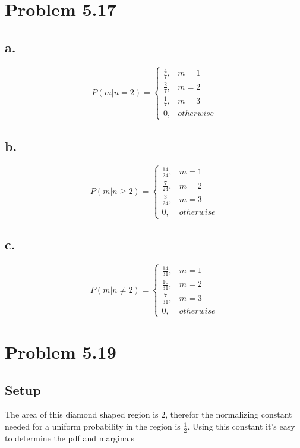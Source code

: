 \documentclass[12pt]{article}
\begin{document}
\section*{Problem 5.17}
\subsection*{a.}
\[P(m|n=2) = \begin{cases}
    \frac{4}{7}, & m = 1 \\
    \frac{2}{7}, & m = 2 \\
    \frac{1}{7}, & m = 3 \\
     0, & otherwise
   \end{cases}
\]

\subsection*{b.}
\[P(m|n\geq2) = \begin{cases}
    \frac{14}{24}, & m = 1 \\
    \frac{7}{24}, & m = 2 \\
    \frac{3}{24}, & m = 3 \\
     0, & otherwise
   \end{cases}
\]

\subsection*{c.}
\[P(m|n\neq2) = \begin{cases}
    \frac{14}{31}, & m = 1 \\
    \frac{10}{31}, & m = 2 \\
    \frac{7}{31}, & m = 3 \\
     0, & otherwise
   \end{cases}
\]

\section*{Problem 5.19}
\subsection*{Setup}
The area of this diamond shaped region is 2, therefor the normalizing constant needed for a uniform probability in the region is $\frac{1}{2}$.
Using this constant it's easy to determine the pdf and marginals
\end{document}
